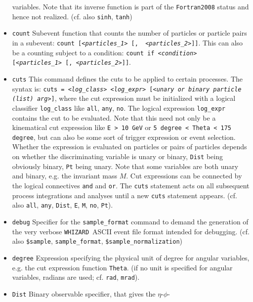 \documentclass[12pt]{book}
\newcommand{\ttt}[1]{\texttt{#1}}
\newcommand{\whizard}{\ttt{WHIZARD}}
\begin{document}
\begin{itemize}
variables. Note that its inverse function is part of the
\ttt{Fortran2008} status and hence not realized. (cf. also \ttt{sinh},
\ttt{tanh})
\item
\ttt{count} \newline
Subevent function that counts the number of particles or particle
pairs in a subevent: \ttt{count [{\em <particles\_1>} [, {\em
<particles\_2>}]]}. This can also be a counting subject to a
condition: \ttt{count if {\em <condition>} [{\em <particles\_1>} [,
{\em <particles\_2>}]]}.
\item
\ttt{cuts} \newline
This command defines the cuts to be applied to certain processes. The
syntax is: \ttt{cuts = {\em <log\_class>} {\em <log\_expr>} [{\em <unary or binary
  particle (list) arg>}]}, where the cut expression must be initialized
with a logical classifier \ttt{log\_class} like \ttt{all}, \ttt{any},
\ttt{no}. The logical expression \ttt{log\_expr} contains the cut to
be evaluated. Note that this need not only be a kinematical cut
expression like \ttt{E > 10  GeV} or \ttt{5 degree < Theta < 175 degree},
but can also be some sort of trigger expression or event selection.
Whether the expression is evaluated on particles or pairs
of particles depends on whether the discriminating variable is unary or
binary, \ttt{Dist} being obviously binary, \ttt{Pt} being unary. Note that
some variables are both unary and binary, e.g. the invariant mass $M$. Cut
expressions can be connected by the logical  connectives \ttt{and} and
\ttt{or}. The \ttt{cuts} statement acts on all subsequent process
integrations and analyses until a new \ttt{cuts} statement appears.
(cf. also \ttt{all}, \ttt{any},
\ttt{Dist}, \ttt{E}, \ttt{M},
\ttt{no}, \ttt{Pt}).
\item
\ttt{debug} \newline
Specifier for the \ttt{sample\_format} command to demand the
generation of the very verbose \whizard\ ASCII event
file format intended for debugging. (cf. also \ttt{\$sample},
\ttt{sample\_format}, \ttt{\$sample\_normalization})
\item
\ttt{degree} \newline
Expression specifying the physical unit of degree for angular
variables, e.g. the cut expression function \ttt{Theta}. (if no unit is
specified for angular variables, radians are used; cf. \ttt{rad}, \ttt{mrad}).
\item
\ttt{Dist} \newline
Binary observable specifier, that gives the $\eta$-$\phi$-

\end{itemize}
\end{document}
